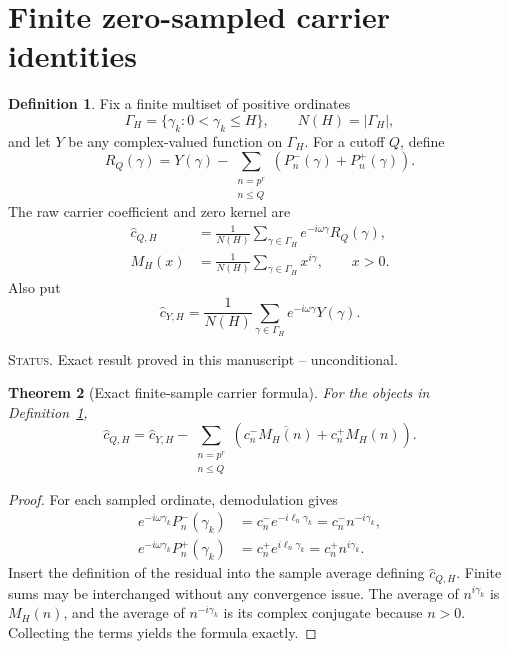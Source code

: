 \documentclass[11pt]{amsart}
\numberwithin{equation}{section}
\theoremstyle{plain}
\newtheorem{theorem}{Theorem}[section]
\theoremstyle{definition}
\newtheorem{definition}[theorem]{Definition}
\theoremstyle{remark}
\newcommand{\1}{\mathbf{1}}
\newcommand{\statusnote}[1]{%
  \par\smallskip\noindent
  \begingroup\footnotesize\textsc{Status.} #1\endgroup
  \par\smallskip}
\begin{document}
\section{Finite zero-sampled carrier identities}
\label{sec:exact_area_defect}

\begin{definition}
\label{def:abstract_sampled_model}
Fix a finite multiset of positive ordinates
\begin{equation}
\Gamma_H=\{\gamma_k:0<\gamma_k\leq H\},
\qquad N(H)=|\Gamma_H|,
\label{eq:abstract_GammaH}
\end{equation}
and let $Y$ be any complex-valued function on $\Gamma_H$.  For a cutoff
$Q$, define
\begin{equation}
R_Q(\gamma)
=
Y(\gamma)-
\sum_{\substack{n=p^r\\n\leq Q}}
\left(P_n^-(\gamma)+P_n^+(\gamma)\right).
\label{eq:abstract_RQ}
\end{equation}
The raw carrier coefficient and zero kernel are
\begin{align}
\widehat c_{Q,H}
&=
\frac1{N(H)}\sum_{\gamma\in\Gamma_H}
e^{-i\omega\gamma}R_Q(\gamma),
\label{eq:abstract_raw_carrier}
\\
M_H(x)
&=
\frac1{N(H)}\sum_{\gamma\in\Gamma_H}x^{i\gamma},
\qquad x>0.
\label{eq:abstract_MH}
\end{align}
Also put
\begin{equation}
\widehat c_{Y,H}
=
\frac1{N(H)}\sum_{\gamma\in\Gamma_H}
e^{-i\omega\gamma}Y(\gamma).
\label{eq:abstract_cYH}
\end{equation}
\end{definition}

\statusnote{Exact result proved in this manuscript -- unconditional.}
\begin{theorem}[Exact finite-sample carrier formula]
\label{thm:abstract_carrier_formula}
For the objects in Definition~\ref{def:abstract_sampled_model},
\begin{equation}
\boxed{
\widehat c_{Q,H}
=
\widehat c_{Y,H}
-
\sum_{\substack{n=p^r\\n\leq Q}}
\left(c_n^-\overline{M_H(n)}+c_n^+M_H(n)\right).
}
\label{eq:abstract_carrier_formula}
\end{equation}
\end{theorem}

\begin{proof}
For each sampled ordinate, demodulation gives
\begin{align}
e^{-i\omega\gamma_k}P_n^-(\gamma_k)
&=
c_n^-e^{-i\ell_n\gamma_k}
=
c_n^-n^{-i\gamma_k},
\label{eq:abstract_carrier_minus_proof}
\\
e^{-i\omega\gamma_k}P_n^+(\gamma_k)
&=
c_n^+e^{i\ell_n\gamma_k}
=
c_n^+n^{i\gamma_k}.
\label{eq:abstract_carrier_plus_proof}
\end{align}
Insert the definition of the residual into the sample average defining
\(\widehat c_{Q,H}\).  Finite sums may be interchanged without any
convergence issue.  The average of \(n^{i\gamma_k}\) is \(M_H(n)\), and
the average of \(n^{-i\gamma_k}\) is its complex conjugate because
\(n>0\).  Collecting the terms yields the formula exactly.
\end{proof}
\end{document}
